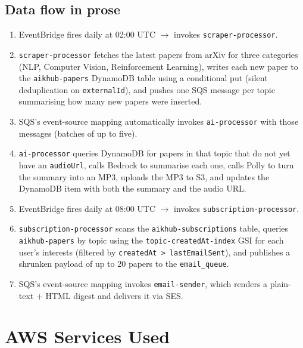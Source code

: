 \documentclass[11pt,a4paper]{article}
\begin{document}
\subsection{Data flow in prose}
\begin{enumerate}[leftmargin=*]
  \item EventBridge fires daily at 02:00 UTC $\rightarrow$ invokes \texttt{scraper-processor}.
  \item \texttt{scraper-processor} fetches the latest papers from arXiv for three categories (NLP, Computer Vision, Reinforcement Learning), writes each new paper to the \texttt{aikhub-papers} DynamoDB table using a conditional put (silent deduplication on \texttt{externalId}), and pushes one SQS message per topic summarising how many new papers were inserted.
  \item SQS's event-source mapping automatically invokes \texttt{ai-processor} with those messages (batches of up to five).
  \item \texttt{ai-processor} queries DynamoDB for papers in that topic that do not yet have an \texttt{audioUrl}, calls Bedrock to summarise each one, calls Polly to turn the summary into an MP3, uploads the MP3 to S3, and updates the DynamoDB item with both the summary and the audio URL.
  \item EventBridge fires daily at 08:00 UTC $\rightarrow$ invokes \texttt{subscription-processor}.
  \item \texttt{subscription-processor} scans the \texttt{aikhub-subscriptions} table, queries \texttt{aikhub-papers} by topic using the \texttt{topic-createdAt-index} GSI for each user's interests (filtered by \texttt{createdAt > lastEmailSent}), and publishes a shrunken payload of up to 20 papers to the \texttt{email\_queue}.
  \item SQS's event-source mapping invokes \texttt{email-sender}, which renders a plain-text + HTML digest and delivers it via SES.
\end{enumerate}

\section{AWS Services Used}
\end{document}
